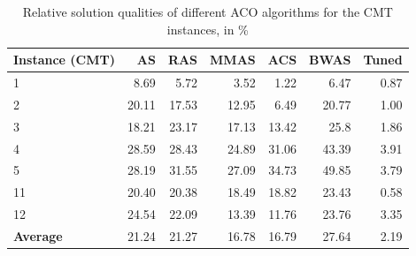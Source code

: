 \documentclass[12pt,a4paper,oneside]{book}
\begin{document}
\begin{table}[]
\centering
\caption{Relative solution qualities of different ACO algorithms for the CMT instances, in \%}
\label{tbl:benchmark}
\begin{tabular}{|l|r|r|r|r|r|r|}
\hline
\textbf{Instance (CMT)} & \textbf{AS} & \textbf{RAS} &\textbf{MMAS} & \textbf{ACS} & \textbf{BWAS} & \textbf{Tuned} \\ \hline
1                            & 8.69                  & 5.72                   & 3.52                    & 1.22                   & 6.47                    & 0.87                     \\ \hline
2                            & 20.11                 & 17.53                  & 12.95                   & 6.49                   & 20.77                   & 1.00                        \\ \hline
3                            & 18.21                 & 23.17                  & 17.13                   & 13.42                  & 25.8                    & 1.86                     \\ \hline
4                            & 28.59                 & 28.43                  & 24.89                   & 31.06                  & 43.39                   & 3.91                     \\ \hline
5                            & 28.19                 & 31.55                  & 27.09                   & 34.73                  & 49.85                   & 3.79                     \\ \hline
11                           & 20.40                 & 20.38                  & 18.49                   & 18.82                  & 23.43                   & 0.58                     \\ \hline
12                           & 24.54                 & 22.09                  & 13.39                   & 11.76                  & 23.76                   & 3.35                     \\ \hline
\textbf{Average}             & 21.24                 & 21.27                  & 16.78                   & 16.79                   & 27.64                    & 2.19                    \\ \hline
\end{tabular}
\end{table}
\end{document}
